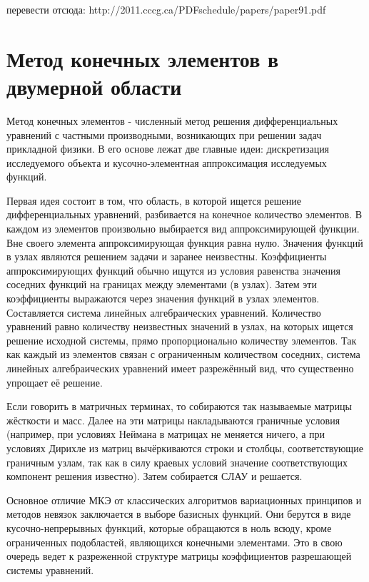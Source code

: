 \documentclass[14pt]{extreport}
\begin{document}
перевести отсюда:
http://2011.cccg.ca/PDFschedule/papers/paper91.pdf





\chapter{Метод конечных элементов в двумерной области}

Метод конечных элементов \cite{Pankratov:FEM,Zenkevich:1986:FEM} - численный метод решения дифференциальных уравнений с частными производными, возникающих при решении задач прикладной физики.
	В его основе лежат две главные идеи: дискретизация исследуемого объекта и кусочно-элементная аппроксимация исследуемых функций.

Первая идея состоит в том, что область, в которой ищется решение дифференциальных уравнений, разбивается на конечное количество элементов. В каждом из элементов произвольно выбирается вид аппроксимирующей функции. Вне своего элемента аппроксимирующая функция равна нулю. Значения функций в узлах являются решением задачи и заранее неизвестны. Коэффициенты аппроксимирующих функций обычно ищутся из условия равенства значения соседних функций на границах между элементами (в узлах). Затем эти коэффициенты выражаются через значения функций в узлах элементов. Составляется система линейных алгебраических уравнений. Количество уравнений равно количеству неизвестных значений в узлах, на которых ищется решение исходной системы, прямо пропорционально количеству элементов. Так как каждый из элементов связан с ограниченным количеством соседних, система линейных алгебраических уравнений имеет разрежённый вид, что существенно упрощает её решение. 

Если говорить в матричных терминах, то собираются так называемые матрицы жёсткости и масс. Далее на эти матрицы накладываются граничные условия (например, при условиях Неймана в матрицах не меняется ничего, а при условиях Дирихле из матриц вычёркиваются строки и столбцы, соответствующие граничным узлам, так как в силу краевых условий значение соответствующих компонент решения известно). Затем собирается СЛАУ и решается.

Основное отличие МКЭ от классических алгоритмов вариационных принципов и методов невязок заключается в выборе базисных функций. Они берутся в виде кусочно-непрерывных функций, которые обращаются в ноль всюду, кроме ограниченных подобластей, являющихся конечными элементами. Это в свою очередь ведет к разреженной структуре матрицы коэффициентов разрешающей системы уравнений.
\end{document}
